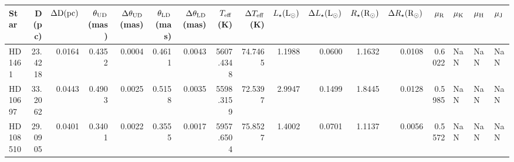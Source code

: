\begin{tabular}{lrrrrrrrrrrrrrlll}
\toprule
Star & D (pc) & $\Delta \rm D (pc)$ & $\theta_{\rm UD}$ (mas) & $\Delta\theta_{\rm UD}$ (mas) & $\theta_{\rm LD}$ (mas) & $\Delta\theta_{\rm LD}$ (mas) & $T_{\rm eff}$ (K) & $\Delta T_{\rm eff}$ (K) & $L_{\star} (\rm L_{\odot})$ & $\Delta L_{\star} (\rm L_{\odot})$ & $R_{\star} (\rm R_{\odot})$ & $\Delta R_{\star} (\rm R_{\odot})$ & $\mu_{\rm R}$ & $\mu_{\rm K}$ & $\mu_{\rm H}$ & $\mu_{\rm J}$ \\
\midrule
HD 1461 & 23.4218 & 0.0164 & 0.4352 & 0.0004 & 0.4611 & 0.0043 & 5607.4348 & 74.7465 & 1.1988 & 0.0600 & 1.1632 & 0.0108 & 0.6022 & NaN & NaN & NaN \\
HD 10697 & 33.2062 & 0.0443 & 0.4903 & 0.0025 & 0.5158 & 0.0035 & 5598.3159 & 72.5397 & 2.9947 & 0.1499 & 1.8445 & 0.0128 & 0.5985 & NaN & NaN & NaN \\
HD 108510 & 29.0905 & 0.0401 & 0.3401 & 0.0022 & 0.3555 & 0.0017 & 5957.6504 & 75.8527 & 1.4002 & 0.0701 & 1.1137 & 0.0056 & 0.5572 & NaN & NaN & NaN \\
\bottomrule
\end{tabular}
